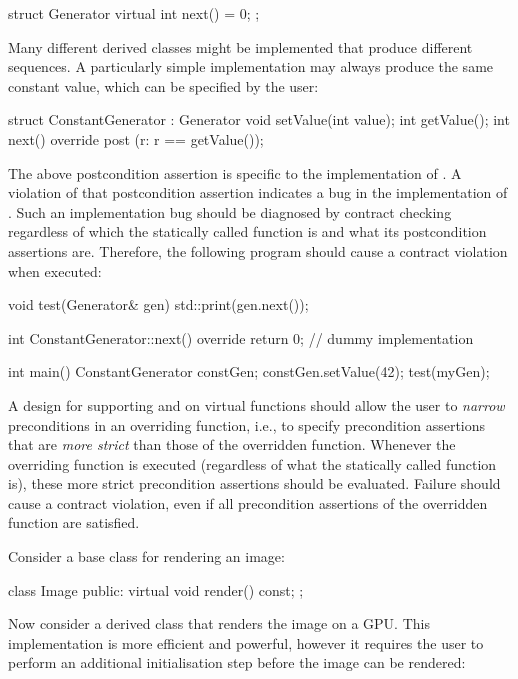 \begin{codeblock}
struct Generator {
  virtual int next() = 0;
};
\end{codeblock}
Many different derived classes might be implemented that produce different sequences. A particularly simple implementation may always produce the same constant value, which can be specified by the user:
\begin{codeblock}
struct ConstantGenerator : Generator {
  void setValue(int value);
  int getValue(); 
  int next() override
    post (r: r == getValue());
}
\end{codeblock}
The above postcondition assertion is specific to the implementation of \allowbreak{}. A violation of that postcondition assertion indicates a bug in the implementation of . Such an implementation bug should be diagnosed by contract checking regardless of which the statically called function is and what its postcondition assertions are. Therefore, the following program should cause a contract violation when executed:
\begin{codeblock}
void test(Generator& gen) {
  std::print(gen.next());
}

int ConstantGenerator::next() override {
  return 0;  // dummy implementation  
} 

int main() {
  ConstantGenerator constGen;
  constGen.setValue(42);
  test(myGen);
}
\end{codeblock}



A design for supporting  and  on virtual functions should allow the user to \emph{narrow} preconditions in an overriding function, i.e., to specify precondition assertions 
 that are \emph{more strict} than those of the overridden function. Whenever the overriding function is executed (regardless of what the statically called function is), these more strict precondition assertions should be evaluated. Failure should cause a contract violation, even if all precondition assertions of the overridden function are satisfied.
 
Consider a base class for rendering an image:

\begin{codeblock}
class Image {
public:
  virtual void render() const;
};
\end{codeblock}

Now consider a derived class that renders the image on a GPU. This implementation is more efficient and powerful, however it requires the user to perform an additional initialisation step before the image can be rendered:

